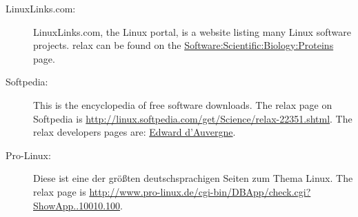\begin{description}
\item[LinuxLinks.com:]  LinuxLinks.com, the Linux portal, is a website listing many Linux software projects.  relax can be found on the \href{http://linuxlinks.com/Software/Scientific/Biology/Proteins/}{Software:\-Scientific:\-Biology:\-Proteins} page.
\item[Softpedia:]  This is the encyclopedia of free software downloads.  The relax page on Softpedia is \href{http://linux.softpedia.com/get/Science/relax-22351.shtml}{http://linux.softpedia.com/get/Science/relax-22351.shtml}.  The relax developers pages are:  \href{http://linux.softpedia.com/developer/Edward-d-039-Auvergne-5136.html}{Edward d'Auvergne}.
\item[Pro-Linux:]  Diese ist eine der gr\"o{\ss}ten deutschsprachigen Seiten zum Thema Linux.  The relax page is \href{http://www.pro-linux.de/cgi-bin/DBApp/check.cgi?ShowApp..10010.100}{http://\-www.\-pro\--linux.\-de/\-cgi\--bin/\-DB\-App/\-check\-.cgi\-?ShowApp..10010.100}.
\end{description}

